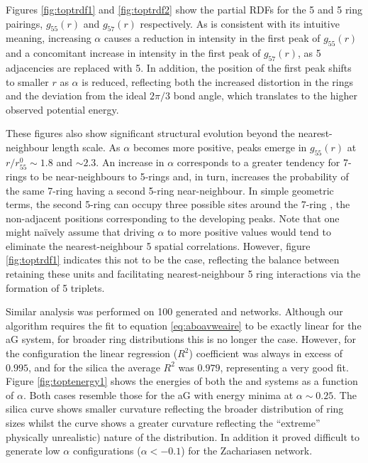 Figures \ref{fig:toptrdf1} and \ref{fig:toptrdf2} show the partial RDFs for the 5 and 5 ring pairings, $g_{55}\left(r\right)$ and $g_{57}\left(r\right)$ respectively.
As is consistent with its intuitive meaning, increasing $\alpha$ causes a reduction in intensity in the first peak of $g_{55}\left(r\right)$ and a concomitant increase in intensity in the first peak of $g_{57}\left(r\right)$, as 5 adjacencies are replaced with 5. 
In addition, the position of the first peak shifts to smaller $r$ as $\alpha$ is reduced, reflecting both the increased distortion in the rings and the deviation from the ideal $2\pi/3$ bond angle, which translates to the higher observed potential energy.

These figures also show significant structural evolution beyond the nearest-neighbour length scale. 
As $\alpha$ becomes more positive, peaks emerge in $g_{55}\left(r\right)$ at $r/r_{55}^0\sim{1.8}$ and $\sim{2.3}$. 
An increase in $\alpha$ corresponds to a greater tendency for 7\--rings to
be near\--neighbours to 5\--rings and, in turn, increases the probability of the same 7\--ring having a second 5\--ring near\--neighbour. 
In simple geometric terms, the second 5\--ring can occupy three possible sites around the 7\--ring , the non\--adjacent positions corresponding to the developing peaks. 
Note that one might na\"ively assume that driving $\alpha$ to more positive values would tend to eliminate the nearest-neighbour 5 spatial correlations. However, figure \ref{fig:toptrdf1} indicates this not to be the case, reflecting the balance between retaining these units and facilitating nearest\--neighbour 5 ring interactions via the formation of 5 triplets.

Similar analysis was performed on 100 generated \zach{} and \sioii{} networks.
Although our algorithm requires the fit to equation \eqref{eq:aboavweaire} to be exactly linear for the aG system, for broader ring distributions this is no longer the case. 
However, for the \zach{} configuration the linear regression ($R^2$) coefficient was always in excess of $0.995$, and for the silica the average $R^{2}$ was $0.979$, representing a very good fit. 
Figure \ref{fig:toptenergy1} shows the energies of both the \zach{} and \sioii{} systems as a function of $\alpha$. 
Both cases resemble those for the aG with energy minima at $\alpha\sim{0.25}$. The silica curve shows smaller curvature reflecting the broader distribution
of ring sizes whilst the \zach{} curve shows a greater curvature reflecting the ``extreme'' \ie{} physically unrealistic) nature of the distribution.
In addition it proved difficult to generate low $\alpha$ configurations ($\alpha<-0.1$) for the Zachariasen network.


